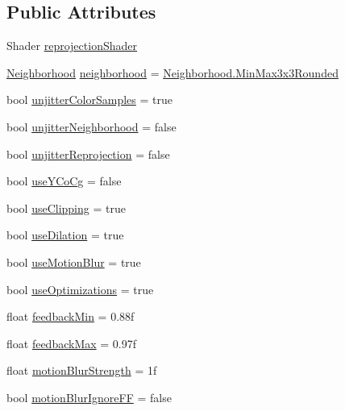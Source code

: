 \subsection*{Public Attributes}
\begin{DoxyCompactItemize}
\item 
Shader \mbox{\hyperlink{class_temporal_reprojection_ac0bc023519956124bb77b3a66c95e2b6}{reprojection\+Shader}}
\item 
\mbox{\hyperlink{class_temporal_reprojection_a6b3343c06d004430c301f11de9bc732c}{Neighborhood}} \mbox{\hyperlink{class_temporal_reprojection_ac9def060454294eb980e711f3b86024d}{neighborhood}} = \mbox{\hyperlink{class_temporal_reprojection_a6b3343c06d004430c301f11de9bc732ca18aa98e3dd602e39b1c5ba8e71132360}{Neighborhood.\+Min\+Max3x3\+Rounded}}
\item 
bool \mbox{\hyperlink{class_temporal_reprojection_aeaba2237b1425f7c5b70e6b80a9d33ba}{unjitter\+Color\+Samples}} = true
\item 
bool \mbox{\hyperlink{class_temporal_reprojection_a2fc9ced5dc3ab49a5aa092f0a8818fb0}{unjitter\+Neighborhood}} = false
\item 
bool \mbox{\hyperlink{class_temporal_reprojection_a9c344d41248eeac0563ae57ea0f46f2c}{unjitter\+Reprojection}} = false
\item 
bool \mbox{\hyperlink{class_temporal_reprojection_a34290c66bbd58600c6500bb3409b1193}{use\+Y\+Co\+Cg}} = false
\item 
bool \mbox{\hyperlink{class_temporal_reprojection_ae788c37659836b4f9b83f7c7a91b4fa4}{use\+Clipping}} = true
\item 
bool \mbox{\hyperlink{class_temporal_reprojection_a8a1f9e58baaebc49f71508de4f662dad}{use\+Dilation}} = true
\item 
bool \mbox{\hyperlink{class_temporal_reprojection_a613476b21f7c7dbb2e75f80eff340ecf}{use\+Motion\+Blur}} = true
\item 
bool \mbox{\hyperlink{class_temporal_reprojection_a251662ecec722c2bf165fd8f4f78a3d3}{use\+Optimizations}} = true
\item 
float \mbox{\hyperlink{class_temporal_reprojection_ae2291390128d82f715961a16d293ca14}{feedback\+Min}} = 0.\+88f
\item 
float \mbox{\hyperlink{class_temporal_reprojection_a85cde61603fca7424314e2d224a1b0ba}{feedback\+Max}} = 0.\+97f
\item 
float \mbox{\hyperlink{class_temporal_reprojection_abd4dafd0051b42e74282a5c9a00ebdae}{motion\+Blur\+Strength}} = 1f
\item 
bool \mbox{\hyperlink{class_temporal_reprojection_a7f6577e9120313b9beeb30984da54a9c}{motion\+Blur\+Ignore\+FF}} = false
\end{DoxyCompactItemize}
